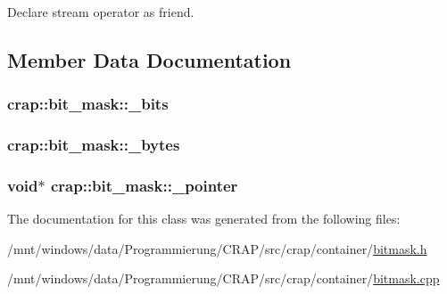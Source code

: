 Declare stream operator as friend. 



\subsection{Member Data Documentation}
\hypertarget{classcrap_1_1bit__mask_ae81a3f9f9e8d8bad564985882b1b9a5d}{
\subsubsection[{\-\_\-bits}]{ crap\-::bit\-\_\-mask\-::\-\_\-bits\hspace{0.3cm}{\ttfamily [protected]}}}\label{classcrap_1_1bit__mask_ae81a3f9f9e8d8bad564985882b1b9a5d}
\hypertarget{classcrap_1_1bit__mask_ad2e0fc867c1197151d99c1b6b01384aa}{
\subsubsection[{\-\_\-bytes}]{ crap\-::bit\-\_\-mask\-::\-\_\-bytes\hspace{0.3cm}{\ttfamily [protected]}}}\label{classcrap_1_1bit__mask_ad2e0fc867c1197151d99c1b6b01384aa}
\hypertarget{classcrap_1_1bit__mask_ae17fa85acdd359a55c29d22e2b0eda06}{
\subsubsection[{\-\_\-pointer}]{\setlength{\rightskip}{0pt plus 5cm}void$\ast$ crap\-::bit\-\_\-mask\-::\-\_\-pointer\hspace{0.3cm}{\ttfamily [protected]}}}\label{classcrap_1_1bit__mask_ae17fa85acdd359a55c29d22e2b0eda06}


The documentation for this class was generated from the following files\-:\begin{DoxyCompactItemize}
\item 
/mnt/windows/data/\-Programmierung/\-C\-R\-A\-P/src/crap/container/\hyperlink{bitmask_8h}{bitmask.\-h}\item 
/mnt/windows/data/\-Programmierung/\-C\-R\-A\-P/src/crap/container/\hyperlink{bitmask_8cpp}{bitmask.\-cpp}\end{DoxyCompactItemize}
